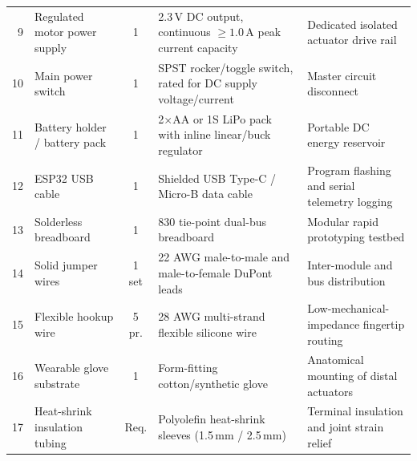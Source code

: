 \documentclass[10pt,twocolumn]{article}
\begin{document}
\begin{table}[t]
\begin{tabularx}{\textwidth}{r p{4.2cm} c p{6.8cm} X}
9  & Regulated motor power supply    & 1     & 2.3\,V DC output, continuous $\ge 1.0$\,A peak current capacity & Dedicated isolated actuator drive rail \\
10 & Main power switch               & 1     & SPST rocker/toggle switch, rated for DC supply voltage/current & Master circuit disconnect \\
11 & Battery holder / battery pack   & 1     & 2$\times$AA or 1S LiPo pack with inline linear/buck regulator & Portable DC energy reservoir \\
12 & ESP32 USB cable                 & 1     & Shielded USB Type-C / Micro-B data cable & Program flashing and serial telemetry logging \\
13 & Solderless breadboard           & 1     & 830 tie-point dual-bus breadboard & Modular rapid prototyping testbed \\
14 & Solid jumper wires              & 1 set & 22 AWG male-to-male and male-to-female DuPont leads & Inter-module and bus distribution \\
15 & Flexible hookup wire            & 5 pr. & 28 AWG multi-strand flexible silicone wire & Low-mechanical-impedance fingertip routing \\
16 & Wearable glove substrate        & 1     & Form-fitting cotton/synthetic glove & Anatomical mounting of distal actuators \\
17 & Heat-shrink insulation tubing   & Req.  & Polyolefin heat-shrink sleeves (1.5\,mm / 2.5\,mm) & Terminal insulation and joint strain relief \\
\bottomrule
\end{tabularx}
\end{table}
\end{document}
